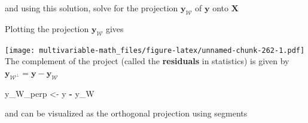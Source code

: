 \documentclass[
]{book}
\newenvironment{Shaded}{\begin{snugshade}}{\end{snugshade}}
\newcommand{\CommentTok}[1]{\textcolor[rgb]{0.56,0.35,0.01}{\textit{#1}}}
\newcommand{\DataTypeTok}[1]{\textcolor[rgb]{0.13,0.29,0.53}{#1}}
\newcommand{\DecValTok}[1]{\textcolor[rgb]{0.00,0.00,0.81}{#1}}
\newcommand{\KeywordTok}[1]{\textcolor[rgb]{0.13,0.29,0.53}{\textbf{#1}}}
\newcommand{\NormalTok}[1]{#1}
\newcommand{\OperatorTok}[1]{\textcolor[rgb]{0.81,0.36,0.00}{\textbf{#1}}}
\newcommand{\StringTok}[1]{\textcolor[rgb]{0.31,0.60,0.02}{#1}}
\theoremstyle{definition}
\theoremstyle{definition}
\theoremstyle{definition}
\theoremstyle{remark}
\begin{document}
and using this solution, solve for the projection \(\mathbf{y}_{\mathcal{W}}\) of \(\mathbf{y}\) onto \(\mathbf{X}\)

\begin{Shaded}
\end{Shaded}

Plotting the projection \(\mathbf{y}_{\mathcal{W}}\) gives

\begin{Shaded}
\end{Shaded}

\texttt{[image: multivariable-math\_files/figure-latex/unnamed-chunk-262-1.pdf]}
The complement of the project (called the \textbf{residuals} in statistics) is given by \(\mathbf{y}_{\mathcal{W}^\perp} = \mathbf{y} - \mathbf{y}_{\mathcal{W}}\)

\begin{Shaded}
\begin{Highlighting}[]
\NormalTok{y_W_perp <-}\StringTok{ }\NormalTok{y }\OperatorTok{-}\StringTok{ }\NormalTok{y_W}
\end{Highlighting}
\end{Shaded}

and can be visualized as the orthogonal projection using segments
\end{document}

